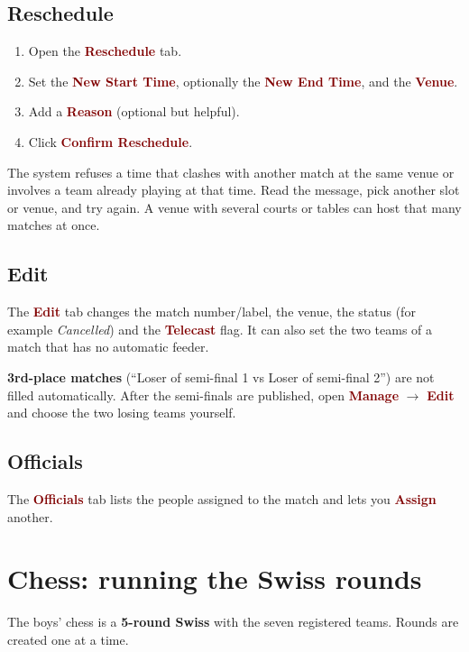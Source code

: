 \documentclass[11pt,a4paper]{article}
\newcommand{\ui}[1]{\textbf{\textcolor{maroon}{#1}}}
\begin{document}
\subsection{Reschedule}
\begin{enumerate}
  \item Open the \ui{Reschedule} tab.
  \item Set the \ui{New Start Time}, optionally the \ui{New End Time}, and the \ui{Venue}.
  \item Add a \ui{Reason} (optional but helpful).
  \item Click \ui{Confirm Reschedule}.
\end{enumerate}
The system refuses a time that clashes with another match at the same venue or involves a team already playing at that time.
Read the message, pick another slot or venue, and try again. A venue with several courts or tables can host that many matches at once.

\subsection{Edit}
The \ui{Edit} tab changes the match number/label, the venue, the status (for example \emph{Cancelled}) and the \ui{Telecast} flag.
It can also set the two teams of a match that has no automatic feeder.

\begin{tip}
\textbf{3rd-place matches} (``Loser of semi-final 1 vs Loser of semi-final 2'') are not filled automatically.
After the semi-finals are published, open \ui{Manage} $\rightarrow$ \ui{Edit} and choose the two losing teams yourself.
\end{tip}

\subsection{Officials}
The \ui{Officials} tab lists the people assigned to the match and lets you \ui{Assign} another.

\section{Chess: running the Swiss rounds}

The boys' chess is a \textbf{5-round Swiss} with the seven registered teams. Rounds are created one at a time.
\end{document}
